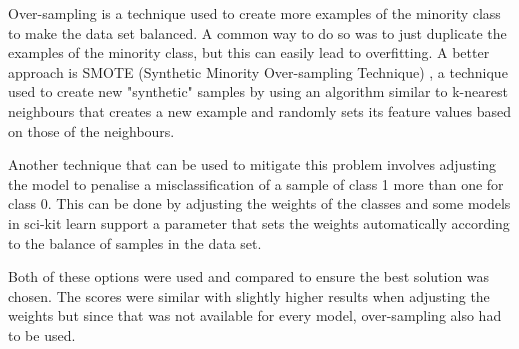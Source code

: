 Over-sampling is a technique used to create more examples of the minority class to make the data set balanced. A common way to do so was to just duplicate the examples of the minority class, but this can easily lead to overfitting. A better approach is SMOTE (Synthetic Minority Over-sampling Technique) \cite{chawla2002smote}, a technique used to create new "synthetic" samples by using an algorithm similar to k-nearest neighbours that creates a new example and randomly sets its feature values based on those of the neighbours. 

Another technique that can be used to mitigate this problem involves adjusting the model to penalise a misclassification of a sample of class 1 more than one for class 0. This can be done by adjusting the weights of the classes and some models in sci-kit learn support a parameter that sets the weights automatically according to the balance of samples in the data set.

Both of these options were used and compared to ensure the best solution was chosen. The scores were similar with slightly higher results when adjusting the weights but since that was not available for every model, over-sampling also had to be used. 

